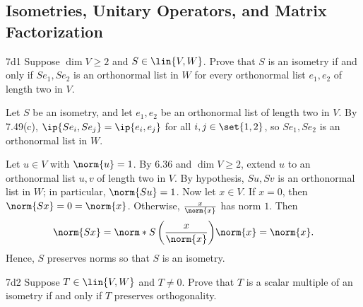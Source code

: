 \subsection{Isometries, Unitary Operators, and Matrix Factorization}

\begin{exercise}{7d1}
    Suppose $\dim V \geq 2$ and $S \in \lin{V, W}$.
    Prove that $S$ is an isometry if and only if $Se_1, Se_2$ is an orthonormal list in $W$ for every orthonormal list $e_1, e_2$ of length two in $V$.
\end{exercise}

\begin{soliff}
    \rightimp Let $S$ be an isometry, and let $e_1, e_2$ be an orthonormal list of length two in $V$.
    By 7.49(c), $\ip{S e_i, S e_j} = \ip{e_i, e_j}$ for all $i, j \in \set{1, 2}$, so $Se_1, Se_2$ is an orthonormal list in $W$.

    \leftimp Let $u \in V$ with $\norm{u} = 1$.
    By 6.36 and $\dim V \geq 2$, extend $u$ to an orthonormal list $u, v$ of length two in $V$.
    By hypothesis, $Su, Sv$ is an orthonormal list in $W$; in particular, $\norm{Su} = 1$.
    Now let $x \in V$.
    If $x = 0$, then $\norm{Sx} = 0 = \norm{x}$.
    Otherwise, $\frac{x}{\norm{x}}$ has norm $1$.
    Then
    \[
        \norm{Sx} = \norm*{S\left(\frac{x}{\norm{x}}\right)} \norm{x} = \norm{x}.
    \]
    Hence, $S$ preserves norms so that $S$ is an isometry.
\end{soliff}

\begin{exercise}{7d2}
    Suppose $T \in \lin{V, W}$ and $T \neq 0$.
    Prove that $T$ is a scalar multiple of an isometry if and only if $T$ preserves orthogonality.

\end{exercise}


